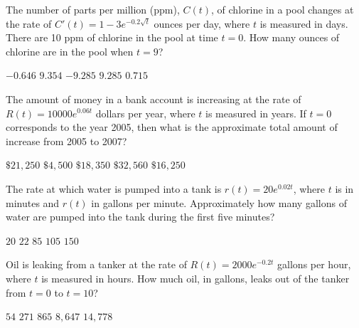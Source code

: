 \begin{questions}
    \question The number of parts per million (ppm), $C(t)$, of chlorine in a pool changes at the rate of $C'(t) = 1 - 3e^{-0.2\sqrt{t}}$ ounces per day, where $t$ is measured in days. There are 10 ppm of chlorine in the pool at time $t = 0$. How many ounces of chlorine are in the pool when $t = 9$? \\

    \begin{oneparchoices}
        \choice $-0.646$
        \choice $9.354$
        \choice $-9.285$
        \choice $9.285$
        \choice $0.715$
    \end{oneparchoices} \par \horizontalline

    \question The amount of money in a bank account is increasing at the rate of $R(t) = 10000e^{0.06t}$ dollars per year, where $t$ is measured in years. If $t = 0$ corresponds to the year 2005, then what is the approximate total amount of increase from 2005 to 2007? \\

    \begin{oneparchoices}
        \choice $\$21,250$
        \choice $\$4,500$
        \choice $\$18,350$
        \choice $\$32,560$
        \choice $\$16,250$
    \end{oneparchoices} \par \horizontalline

    \question The rate at which water is pumped into a tank is $r(t) = 20e^{0.02t}$, where $t$ is in minutes and $r(t)$ in gallons per minute. Approximately how many gallons of water are pumped into the tank during the first five minutes? \\

    \begin{oneparchoices}
        \choice $20$
        \choice $22$
        \choice $85$
        \choice $105$
        \choice $150$
    \end{oneparchoices} \par \horizontalline

    \question Oil is leaking from a tanker at the rate of $R(t) = 2000e^{-0.2t}$ gallons per hour, where $t$ is measured in hours. How much oil, in gallons, leaks out of the tanker from $t = 0$ to $t = 10$? \\

    \begin{oneparchoices}
        \choice $54$
        \choice $271$
        \choice $865$
        \choice $8,647$
        \choice $14,778$
    \end{oneparchoices} \par \horizontalline
\end{questions}
